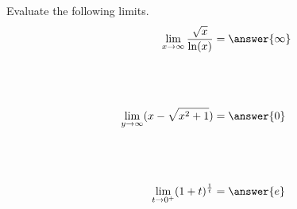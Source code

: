 \documentclass{ximera}
\author{Bobby Ramsey}
\begin{document}
\begin{exercise}


Evaluate the following limits.
\begin{align*}
	\lim_{x\to\infty} \frac{\sqrt{x}}{\ln(x)} &= \answer{\infty} \\ \\ \\ \\
	\lim_{y\to \infty} (x - \sqrt{x^2+1}) &= \answer{0} \\ \\ \\ \\	
	\lim_{t\to0^+} (1+t)^{\frac{1}{t}} &= \answer{e}
\end{align*}

\end{exercise}
\end{document}
